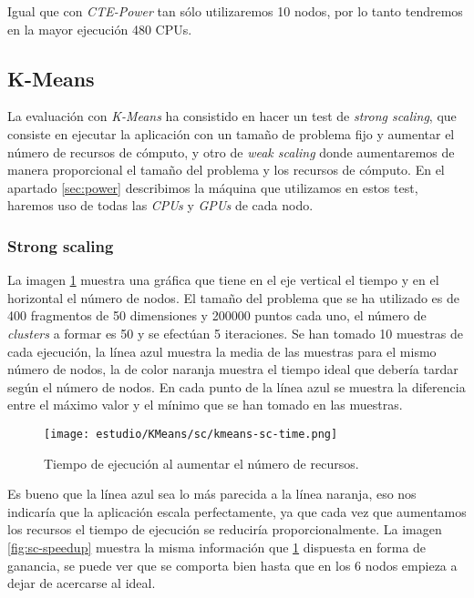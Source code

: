 Igual que con \textit{CTE-Power} tan sólo utilizaremos 10  nodos, por lo tanto tendremos en la mayor ejecución 480 CPUs.

\subsection{K-Means}

La evaluación con \textit{K-Means} ha consistido en hacer un test de \textit{strong scaling}, que consiste en ejecutar la aplicación con un tamaño de problema fijo y aumentar el número de recursos de cómputo, y otro de \textit{weak scaling} donde aumentaremos de manera proporcional el tamaño del problema y los recursos de cómputo. En el apartado \ref{sec:power} describimos la máquina que utilizamos en estos test, haremos uso de todas las \textit{CPUs} y \textit{GPUs} de cada nodo.

\subsubsection{Strong scaling}

La imagen \ref{fig:sc-time} muestra una gráfica que tiene en el eje vertical el tiempo y en el horizontal el número de nodos. El tamaño del problema que se ha utilizado es de 400 fragmentos de 50 dimensiones y 200000 puntos cada uno, el número de \textit{clusters} a formar es 50 y se efectúan 5 iteraciones. Se han tomado 10 muestras de cada ejecución, la línea azul muestra la media de las muestras para el mismo número de nodos, la de color naranja muestra el tiempo ideal que debería tardar según el número de nodos. En cada punto de la línea azul se muestra la diferencia entre el máximo valor y el mínimo que se han tomado en las muestras.

\begin{figure}[H]
	\centering 
	\caption{Tiempo de ejecución al aumentar el número de recursos.}
	\texttt{[image: estudio/KMeans/sc/kmeans-sc-time.png]}
	\label{fig:sc-time}
\end{figure}

Es bueno que la línea azul sea lo más parecida a la línea naranja, eso nos indicaría que la aplicación escala perfectamente, ya que cada vez que aumentamos los recursos el tiempo de ejecución se reduciría proporcionalmente. La imagen \ref{fig:sc-speedup} muestra la misma información que \ref{fig:sc-time} dispuesta en forma de ganancia, se puede ver que se comporta bien hasta que en los 6 nodos empieza a dejar de acercarse al ideal.

